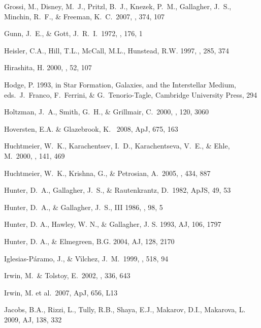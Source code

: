 \documentclass[12pt,preprint]{emulateapj}
\begin{document}
\begin{thebibliography}{}
Grossi, M., Disney, M.~J., Pritzl, B.~J., Knezek, P.~M., Gallagher, J.~S., 
    Minchin, R.~F., \& Freeman, K.~C.\ 2007, \mnras, 374, 107 

Gunn, J.~E., \& Gott, J.~R.~I.\ 1972, \apj, 176, 1 

Heisler, C.A., Hill, T.L., McCall, M.L., Hunstead, R.W. 1997, \mnras , 285, 374

Hirashita, H. 2000, \pasj , 52, 107

Hodge, P. 1993, in Star Formation, Galaxies, and the Interstellar Medium,
   eds.\ J.\ Franco, F.\ Ferrini, \& G.\ Tenorio-Tagle, Cambridge University 
   Press, 294

Holtzman, J.~A., Smith, G.~H., \& Grillmair, C.\ 2000, \aj, 120, 3060 

Hoversten, E.A. \& Glazebrook, K. \ 2008, ApJ, 675, 163 

Huchtmeier, W.~K., Karachentsev, I.~D., Karachentseva, V.~E., \& 
   Ehle, M.\ 2000, \aaps, 141, 469 

Huchtmeier, W.~K., Krishna, G., \& Petrosian, A.\ 2005, \aap, 434, 887 

Hunter, D.~A., Gallagher, J.~S., \& Rautenkrantz, D.\ 1982, ApJS, 49, 53

Hunter, D.~A., \& Gallagher, J.~S., III 1986, \pasp, 98, 5 

Hunter, D. A., Hawley, W. N., \& Gallagher, J. S. 1993, AJ, 106, 1797

Hunter, D. A., \& Elmegreen, B.G. 2004, AJ, 128, 2170

Iglesias-P{\'a}ramo, J., \& V{\'{\i}}lchez, J.~M.\ 1999, \apj, 518, 94 

Irwin, M.~\& Tolstoy, E.\ 2002, \mnras, 336, 643 

Irwin, M. et al.\ 2007, ApJ, 656, L13 

Jacobs, B.A., Rizzi, L., Tully, R.B., Shaya, E.J., Makarov, D.I., Makarova, L. 2009, AJ, 138, 332
 

\end{thebibliography}
\end{document}
